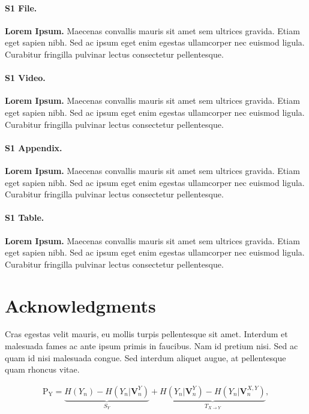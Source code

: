 \documentclass[10pt,letterpaper]{article}
\begin{document}
\paragraph*{S1 File.}
\label{S1_File}
{\bf Lorem Ipsum.}  Maecenas convallis mauris sit amet sem ultrices gravida. Etiam eget sapien nibh. Sed ac ipsum eget enim egestas ullamcorper nec euismod ligula. Curabitur fringilla pulvinar lectus consectetur pellentesque.

\paragraph*{S1 Video.}
\label{S1_Video}
{\bf Lorem Ipsum.}  Maecenas convallis mauris sit amet sem ultrices gravida. Etiam eget sapien nibh. Sed ac ipsum eget enim egestas ullamcorper nec euismod ligula. Curabitur fringilla pulvinar lectus consectetur pellentesque.

\paragraph*{S1 Appendix.}
\label{S1_Appendix}
{\bf Lorem Ipsum.} Maecenas convallis mauris sit amet sem ultrices gravida. Etiam eget sapien nibh. Sed ac ipsum eget enim egestas ullamcorper nec euismod ligula. Curabitur fringilla pulvinar lectus consectetur pellentesque.

\paragraph*{S1 Table.}
\label{S1_Table}
{\bf Lorem Ipsum.} Maecenas convallis mauris sit amet sem ultrices gravida. Etiam eget sapien nibh. Sed ac ipsum eget enim egestas ullamcorper nec euismod ligula. Curabitur fringilla pulvinar lectus consectetur pellentesque.

\section*{Acknowledgments}
Cras egestas velit mauris, eu mollis turpis pellentesque sit amet. Interdum et malesuada fames ac ante ipsum primis in faucibus. Nam id pretium nisi. Sed ac quam id nisi malesuada congue. Sed interdum aliquet augue, at pellentesque quam rhoncus vitae.

\begin{eqnarray}
\label{eq:schemeP} 
	\mathrm{P_Y} = \underbrace{H(Y_n) - H(Y_n|\mathbf{V}^{Y}_{n})}_{S_Y} + \underbrace{H(Y_n|\mathbf{V}^{Y}_{n})- H(Y_n|\mathbf{V}^{X,Y}_{n})}_{T_{X\rightarrow Y}},
\end{eqnarray}
\end{document}
